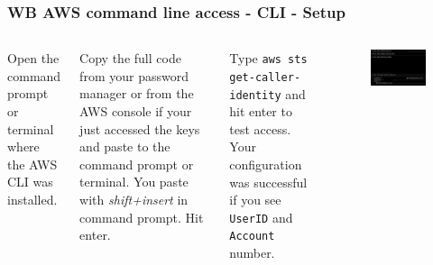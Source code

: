 \documentclass[aspectratio=169]{beamer} %
\begin{document}
\begin{frame}
	\frametitle{WB AWS command line access - CLI - Setup}
	\begin{columns}[c]
		
		Open the command prompt or terminal where the AWS CLI was installed.
		
		\vspace{.5cm}
		
		Copy the full code from your password manager or from the AWS console if your just accessed the keys and paste to the command prompt or terminal. You paste with \textit{shift+insert} in command prompt. Hit enter.
		
		\vspace{.5cm} 
		
		Type \texttt{aws sts get-caller-identity} and hit enter to test access. Your configuration was successful if you see \texttt{UserID} and \texttt{Account} number.
		
		\begin{figure}
			\centering
			\includegraphics[width=1\textwidth]{./img/aws-cli-configure.png}
		\end{figure}
		
	\end{columns}
\end{frame}
\end{document}
